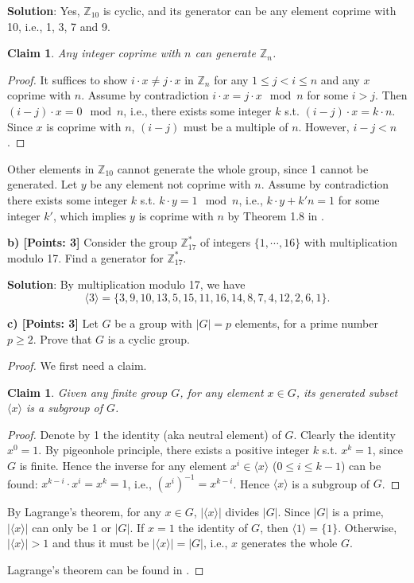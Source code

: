 \documentclass[12pt]{article}
\newcommand{\Z}{\mathbb{Z}}
\newcommand{\angles}[1]{\langle #1 \rangle}
\newtheorem{claim}[theorem]{Claim}
\theoremstyle{definition}
\begin{document}
{\bf Solution}: Yes, $\Z_{10}$ is cyclic, and its generator can be any element coprime with 10, i.e., 1, 3, 7 and 9. 
\begin{claim}
Any integer coprime with $n$ can generate $\Z_n$.
\end{claim}
\begin{proof}
It suffices to show $i\cdot x \not= j \cdot x$ in $\Z_n$ for any $1\leq j < i \leq n$ and any $x$ coprime with $n$. Assume by contradiction $i\cdot x = j \cdot x \mod n$ for some $i > j$. Then $(i-j)\cdot x =0 \mod n$, i.e., there exists some integer $k$ s.t. $(i-j)\cdot x = k\cdot n$. Since $x$ is coprime with $n$, $(i-j)$ must be a multiple of $n$. However, $i-j < n$.
\end{proof}
Other elements in $\Z_{10}$ cannot generate the whole group, since 1 cannot be generated. Let $y$ be any element not coprime with $n$. Assume by contradiction there exists some integer $k$ s.t. $k\cdot y = 1 \mod n$, i.e., $k\cdot y + k' n = 1$ for some integer $k'$, which implies $y$ is coprime with $n$ by Theorem 1.8 in \cite{Shoup09}.

{\bf b) [Points: 3]} Consider the group $\Z_{17}^*$ of integers $\{1, \cdots, 16\}$ with multiplication modulo 17. Find a generator for $\Z_{17}^*$.

{\bf Solution}: By multiplication modulo 17, we have 
$$\angles{3} = \{3, 9, 10, 13, 5, 15, 11, 16, 14, 8, 7, 4, 12, 2, 6, 1\}.$$

{\bf c) [Points: 3]} Let $G$ be a group with $|G| = p$ elements, for a prime number $p\geq 2$. Prove that $G$ is a cyclic group.
\begin{proof}
We first need a claim.
\begin{claim}
Given any finite group $G$, for any element $x\in G$, its generated subset $\angles{x}$ is a subgroup of $G$.
\end{claim}
\begin{proof}
Denote by 1 the identity (aka neutral element) of $G$. Clearly the identity $x^0 = 1$. By pigeonhole principle, there exists a positive integer $k$ s.t. $x^k = 1$, since $G$ is finite. Hence the inverse for any element $x^i \in \angles{x}$ ($0\leq i \leq k-1$) can be found: $x^{k-i} \cdot x^i = x^{k} = 1$, i.e., $(x^i)^{-1} = x^{k-i}$. Hence $\angles{x}$ is a subgroup of $G$.
\end{proof}
By Lagrange's theorem, for any $x\in G$, $|\angles{x}|$ divides $|G|$. Since $|G|$ is a prime, $|\angles{x}|$ can only be 1 or $|G|$. If $x=1$ the identity of $G$, then $\angles{1} = \{1\}$. Otherwise, $|\angles{x}|>1$ and thus it must be $|\angles{x}| = |G|$, i.e., $x$ generates the whole $G$.

Lagrange's theorem can be found in \cite{Shoup09}.
\end{proof}
\end{document}
